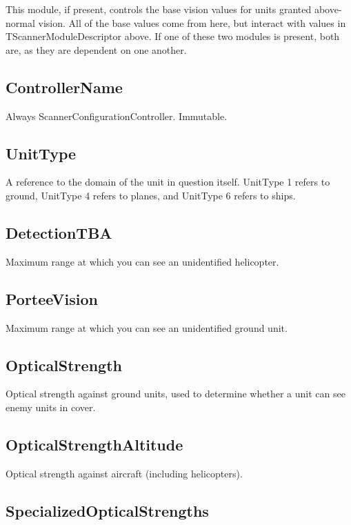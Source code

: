 \documentclass{article}
\begin{document}
This module, if present, controls the base vision values for units granted above-normal vision. All of the base values come from here, but interact with values in TScannerModuleDescriptor above. If one of these two modules is present, both are, as they are dependent on one another.

\subsection{ControllerName}

Always ScannerConfigurationController. Immutable.

\subsection{UnitType}

A reference to the domain of the unit in question itself. UnitType 1 refers to ground, UnitType 4 refers to planes, and UnitType 6 refers to ships.

\subsection{DetectionTBA}

Maximum range at which you can see an unidentified helicopter.

\subsection{PorteeVision}

Maximum range at which you can see an unidentified ground unit.

\subsection{OpticalStrength}

Optical strength against ground units, used to determine whether a unit can see enemy units in cover.

\subsection{OpticalStrengthAltitude}

Optical strength against aircraft (including helicopters).

\subsection{SpecializedOpticalStrengths}
\end{document}
